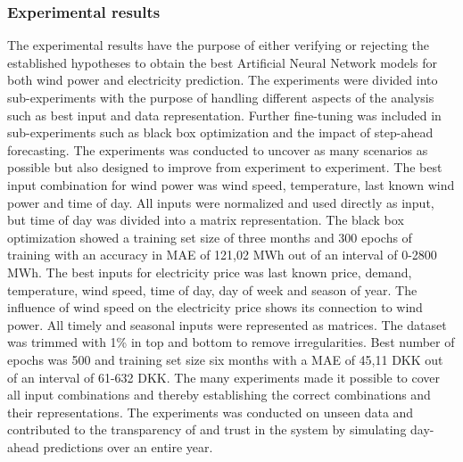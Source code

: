 \subsubsection{Experimental results}
The experimental results have the purpose of either verifying or rejecting the established hypotheses to obtain the best Artificial Neural Network models for both wind power and electricity prediction. The experiments were divided into sub-experiments with the purpose of handling different aspects of the analysis such as best input and data representation. Further fine-tuning was included in sub-experiments such as black box optimization and the impact of step-ahead forecasting. The experiments was conducted to uncover as many scenarios as possible but also designed to improve from experiment to experiment. The best input combination for wind power was wind speed, temperature, last known wind power and time of day. All inputs were normalized and used directly as input, but time of day was divided into a matrix representation. The black box optimization showed a training set size of three months and 300 epochs of training with an accuracy in MAE of 121,02 MWh out of an interval of 0-2800 MWh. The best inputs for electricity price was last known price, demand, temperature, wind speed, time of day, day of week and season of year. The influence of wind speed on the electricity price shows its connection to wind power. All timely and seasonal inputs were represented as matrices. The dataset was trimmed with 1\% in top and bottom to remove irregularities. Best number of epochs was 500 and training set size six months with a MAE of 45,11 DKK out of an interval of 61-632 DKK. The many experiments made it possible to cover all input combinations and thereby establishing the correct combinations and their representations. The experiments was conducted on unseen data and contributed to the transparency of and trust in the system by simulating day-ahead predictions over an entire year.

